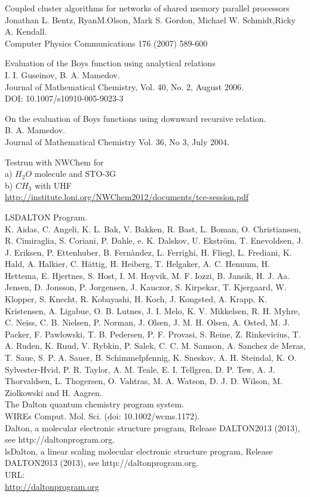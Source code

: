 \documentclass[a4paper,norsk,11pt,twoside]{report}
\begin{document}
\begin{thebibliography}{}
Coupled cluster algorithms for networks of shared memory parallel processors \\
Jonathan L. Bentz, RyanM.Olson, Mark S. Gordon, Michael W. Schmidt,Ricky A. Kendall. \\
Computer Physics Communications 176 (2007) 589-600

Evaluation of the Boys function using analytical relations \\
I. I. Guseinov, B. A. Mamedov. \\
Journal of Mathematical Chemistry, Vol. 40, No. 2, August 2006. \\
DOI: 10.1007/s10910-005-9023-3

On the evaluation of Boys functions using downward recursive relation. \\
B. A. Mamedov. \\
Journal of Mathematical Chemistry Vol. 36, No 3, July 2004.

Testrun with NWChem for \\
a) $H_2O$ molecule and STO-3G \\
b) $CH_3$ with UHF \\
\url{http://institute.loni.org/NWChem2012/documents/tce-session.pdf}

LSDALTON Program. \\
K. Aidas, C. Angeli, K. L. Bak, V. Bakken, R. Bast, L. Boman, O. Christiansen, R. Cimiraglia, S. Coriani, P. Dahle, e. K. Dalskov, U. Ekstr\"om, T. Enevoldsen, J. J. Eriksen, P. Ettenhuber, B. Fern\`andez, L. Ferrighi, H. Fliegl, L. Frediani, K. Hald, A. Halkier, C. H\"attig, H. Heiberg, T. Helgaker, A. C. Hennum, H. Hettema, E. Hjertnes, S. Host, I. M. Hoyvik, M. F. Iozzi, B. Jansik, H. J. Aa. Jensen, D. Jonsson, P. Jorgensen, J. Kauczor, S. Kirpekar, T. Kjergaard, W. Klopper, S. Knecht, R. Kobayashi, H. Koch, J. Kongsted, 
A. Krapp, K. Kristensen, A. Ligabue, O. B. Lutnes, J. I. Melo, K. V. Mikkelsen, R. H. Myhre, C. Neiss, C. B. Nielsen, P. Norman, J. Olsen, J. M. H. Olsen, A. Osted, M. J. Packer, F. Pawlowski, T. B. Pedersen, P. F. Provasi, S. Reine, Z. Rinkevicius, T. A. Ruden, K. Ruud, V. Rybkin, P. Salek, C. C. M. Samson, A. Sanchez de Meras, T. Saue, S. P. A. Sauer, B. Schimmelpfennig, K. Sneskov, A. H. Steindal, K. O. Sylvester-Hvid, P. R. Taylor, A. M. Teale, E. I. Tellgren, D. P. Tew, A. J. Thorvaldsen, L. Thogersen, O. Vahtras, M. A. Watson, D. J. D. Wilson, M. Ziolkowski and H. Aagren. \\
The Dalton quantum chemistry program system. \\
WIREs Comput. Mol. Sci. (doi: 10.1002/wcms.1172). \\
Dalton, a molecular electronic structure program, Release DALTON2013 (2013), see http://daltonprogram.org. \\
lsDalton, a linear scaling molecular electronic structure program, Release DALTON2013 (2013), see http://daltonprogram.org. \\
URL: \\
\url{http://daltonprogram.org} 


\end{thebibliography}
\end{document}
